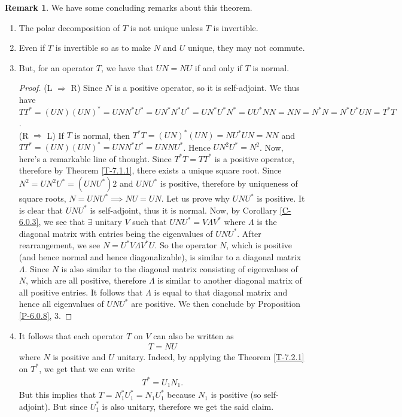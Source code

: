 \documentclass[letterpaper,11pt,twoside]{article}
\theoremstyle{definition}
\theoremstyle{definition}
\theoremstyle{definition}
\newtheorem{remark}[proposition]{\textbf{Remark}}
\theoremstyle{definition}
\theoremstyle{definition}
\theoremstyle{definition}
\theoremstyle{remark}
\theoremstyle{definition}
\begin{document}
	\begin{remark}\label{R-7.2.2}
		We have some concluding remarks about this theorem.
		\begin{enumerate}
			\item {The polar decomposition of $ T $ is not unique unless $ T $ is invertible.}
			\item {Even if $ T $ is invertible so as to make $ N $ and $ U $ unique, they may not commute.}
			\item {But, for an operator $ T $, we have that $ UN=NU $ if and only if $ T $ is normal.
		\begin{proof}
			(L $ \Rightarrow $ R) Since $ N $ is a positive operator, so it is self-adjoint. We thus have $ TT^{*} = (UN)(UN)^{*}= UNN^{*}U^* =UN^*N^*U^*= UN^{*}U^{*}N^{*} = UU^{*}NN = NN  =N^{*}N = N^{*}U^{*}UN = T^{*}T $.\\
			(R $ \Rightarrow $ L) If $ T $ is normal, then $ T^{*}T= (UN)^{*}(UN) = NU^*UN = NN $ and $ TT^{*} = (UN)(UN)^{*} = UNN^{*}U^{*} = UNNU^{*} $. Hence $ UN^2U^{*} =N^2 $. Now, here's a remarkable line of thought. Since $ T^{*}T = TT^{*} $ is a positive operator, therefore by Theorem \ref{T-7.1.1}, there exists a unique square root. Since $N^{2} = UN^{2}U^{*} = (UNU^{*})2 $ and $ UNU^{*} $ is positive, therefore by uniqueness of square roots, $ N = UNU^{*} \implies NU = UN $. Let us prove why $ UNU^{*} $ is positive. It is clear that $ UNU^{*} $ is self-adjoint, thus it is normal. Now, by Corollary \ref{C-6.0.3}, we see that $ \exists $ unitary $ V $ such that $ UNU^{*} = V\Lambda V^{*} $ where $ \Lambda $ is the diagonal matrix with entries being the eigenvalues of $ UNU^{*} $. After rearrangement, we see $ N = U^{*}V\Lambda V^{*}U $. So the operator $ N $, which is positive (and hence normal and hence diagonalizable), is similar to a diagonal matrix $ \Lambda $. Since $ N $ is also similar to the diagonal matrix consisting of eigenvalues of $ N $, which are all positive, therefore $ \Lambda $ is similar to another diagonal matrix of all positive entries. It follows that $ \Lambda $ is equal to that diagonal matrix and hence all eigenvalues of $ UNU^{*} $ are positive. We then conclude by Proposition \ref{P-6.0.8}, 3.
		\end{proof}	
		}
		\item {It follows that each operator $ T $ on $ V $ can also be written as
			\begin{align*}
				T = NU
			\end{align*}
			where $ N $ is positive and $ U $ unitary. Indeed, by applying the Theorem \ref{T-7.2.1} on $ T^{*} $, we get that we can write
	\begin{align*}
		T^{*} = U_1N_1.
	\end{align*}	
	But this implies that $ T = N_1^{*}U_1^{*} = N_1U_1^{*}$ because $ N_1 $ is positive (so self-adjoint). But since $ U_1^{*} $ is also unitary, therefore we get the said claim.
	}
		\end{enumerate}
	\end{remark}
	\ifdim\dimexpr\pagegoal-\pagetotal-\baselineskip\relax>.7\textheight
	\begin{center}
		\rule{3cm}{2pt}
	\end{center}
	\fi
    
\end{document}
